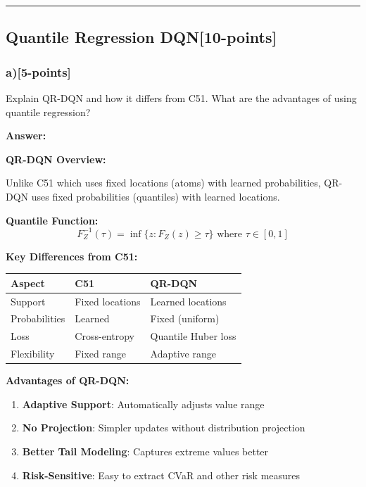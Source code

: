 \documentclass[12pt]{article}
\begin{document}
{{\noindent\rule{\textwidth}{0.2pt}

\subsection{Quantile Regression DQN[10-points]}
\subsubsection{a)[5-points]} Explain QR-DQN and how it differs from C51. What are the advantages of using quantile regression?

\textbf{Answer:}

\textbf{QR-DQN Overview:}

Unlike C51 which uses fixed locations (atoms) with learned probabilities, QR-DQN uses fixed probabilities (quantiles) with learned locations.

\textbf{Quantile Function:}
\begin{equation}
F^{-1}_Z(\tau) = \inf\{z : F_Z(z) \geq \tau\} \text{ where } \tau \in [0,1]
\end{equation}

\textbf{Key Differences from C51:}

\begin{center}
\begin{tabular}{|l|l|l|}
\hline
\textbf{Aspect} & \textbf{C51} & \textbf{QR-DQN} \\
\hline
Support & Fixed locations & Learned locations \\
Probabilities & Learned & Fixed (uniform) \\
Loss & Cross-entropy & Quantile Huber loss \\
Flexibility & Fixed range & Adaptive range \\
\hline
\end{tabular}
\end{center}

\textbf{Advantages of QR-DQN:}
\begin{enumerate}
\item \textbf{Adaptive Support}: Automatically adjusts value range
\item \textbf{No Projection}: Simpler updates without distribution projection
\item \textbf{Better Tail Modeling}: Captures extreme values better
\item \textbf{Risk-Sensitive}: Easy to extract CVaR and other risk measures
\end{enumerate}

}}
\end{document}
